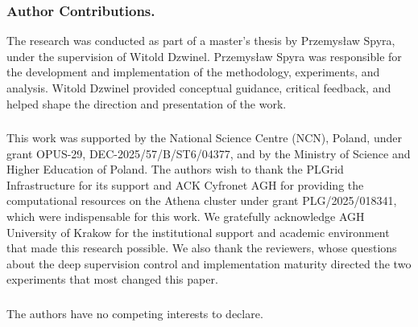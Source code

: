 \documentclass{llncs}
\begin{document}
\begin{credits}
\subsubsection{Author Contributions.}
The research was conducted as part of a master's thesis by
\mbox{Przemys{\l}aw} Spyra, under the supervision of Witold Dzwinel.
\mbox{Przemys{\l}aw} Spyra was responsible for the development and
implementation of the methodology, experiments, and analysis. Witold Dzwinel
provided conceptual guidance, critical feedback, and helped shape the direction
and presentation of the work.

\subsubsection{\ackname}
This work was supported by the National Science Centre (NCN), Poland, under
grant OPUS-29, DEC-2025/57/B/ST6/04377, and by the Ministry of Science and
Higher Education of Poland. The authors wish to thank the PLGrid Infrastructure
for its support and ACK Cyfronet AGH for providing the computational resources
on the Athena cluster under grant PLG/2025/018341, which were indispensable for
this work. We gratefully acknowledge AGH University of Krakow for the
institutional support and academic environment that made this research
possible. We also thank the reviewers, whose questions about the deep
supervision control and implementation maturity directed the two experiments
that most changed this paper.

\subsubsection{\discintname}
The authors have no competing interests to declare.
\end{credits}



\end{document}

